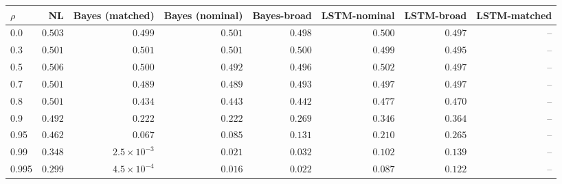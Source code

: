 \begin{tabular}{lrrrrrrr}
\toprule
$\rho$ & NL & Bayes (matched) & Bayes (nominal) & Bayes-broad & LSTM-nominal & LSTM-broad & LSTM-matched \\
\midrule
0.0 & $0.503$ & $0.499$ & $0.501$ & \textit{$0.498$} & $0.500$ & \textit{$0.497$} & -- \\
0.3 & $0.501$ & $0.501$ & $0.501$ & \textit{$0.500$} & $0.499$ & \textit{$0.495$} & -- \\
0.5 & $0.506$ & $0.500$ & $0.492$ & \textit{$0.496$} & $0.502$ & \textit{$0.497$} & -- \\
0.7 & $0.501$ & $0.489$ & $0.489$ & \textit{$0.493$} & $0.497$ & \textit{$0.497$} & -- \\
0.8 & $0.501$ & $0.434$ & $0.443$ & \textit{$0.442$} & $0.477$ & \textit{$0.470$} & -- \\
0.9 & $0.492$ & $0.222$ & $0.222$ & \textit{$0.269$} & $0.346$ & \textit{$0.364$} & -- \\
0.95 & $0.462$ & $0.067$ & $0.085$ & \textit{$0.131$} & $0.210$ & \textit{$0.265$} & -- \\
0.99 & $0.348$ & $2.5\!\times\!10^{-3}$ & $0.021$ & \textit{$0.032$} & $0.102$ & \textit{$0.139$} & -- \\
0.995 & $0.299$ & $4.5\!\times\!10^{-4}$ & $0.016$ & \textit{$0.022$} & $0.087$ & \textit{$0.122$} & -- \\
\bottomrule
\end{tabular}